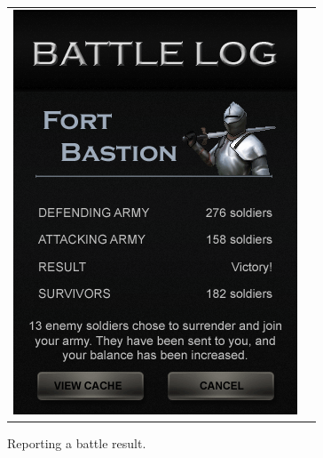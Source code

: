 \begin{figure}[h!]
\begin{tabular}{cc}
\begin{minipage}{0.3\textwidth}
\begin{center}
\begin{minipage}{0.83\textwidth}
		\includegraphics[width=\textwidth]{images/battle_report_mockup}
	\caption{Reporting a battle result.}
		\label{scouting_cache}
		\end{minipage}
		\end{center}
	\end{minipage}
	\begin{minipage}{0.3\textwidth}
		\begin{center}
		\begin{minipage}{0.83\textwidth}

\end{minipage}
\end{center}
\end{minipage}
\end{tabular}
\end{figure}
